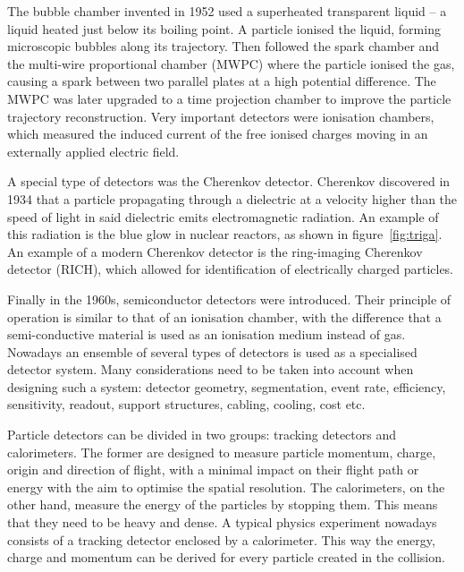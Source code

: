 The bubble chamber invented in 1952 used a superheated transparent liquid -- a liquid heated just below its boiling point. A particle ionised the liquid, forming microscopic bubbles along its trajectory. Then followed the spark chamber and the multi-wire proportional chamber (MWPC) where the particle ionised the gas, causing a spark between two parallel plates at a high potential difference. The MWPC was later upgraded to a time projection chamber to improve the particle trajectory reconstruction. Very important detectors were ionisation chambers, which measured the induced current of the free ionised charges moving in an externally applied electric field. 

A special type of detectors was the Cherenkov detector. Cherenkov discovered in 1934 that a particle propagating through a dielectric at a velocity higher than the speed of light in said dielectric emits electromagnetic radiation. An example of this radiation is the blue glow in nuclear reactors, as shown in figure~\ref{fig:triga}. An example of a modern Cherenkov detector is the ring-imaging Cherenkov detector (RICH), which allowed for identification of electrically charged particles.

Finally in the 1960s, semiconductor detectors were introduced. Their principle of operation is similar to that of an ionisation chamber, with the difference that a semi-conductive material is used as an ionisation medium instead of gas. Nowadays an ensemble of several types of detectors is used as a specialised detector system. Many considerations need to be taken into account when designing such a system: detector geometry, segmentation, event rate, efficiency, sensitivity, readout, support structures, cabling, cooling, cost etc.

Particle detectors can be divided in two groups: tracking detectors and calorimeters. The former are designed to measure  particle momentum, charge, origin and direction of flight, with a minimal impact on their flight path or energy with the aim to optimise the spatial resolution. The calorimeters, on the other hand, measure the energy of the particles by stopping them. This means that they need to be heavy and dense. A typical physics experiment nowadays consists of a tracking detector enclosed by a calorimeter. This way the energy, charge and momentum can be derived for every particle created in the collision.





